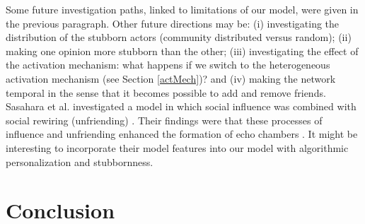 \documentclass[11 pt , letterpaper , twoside , openright]{book}
\begin{document}
Some future investigation paths, linked to limitations of our model, were given in the previous paragraph. Other future directions may be: (i) investigating the distribution of the stubborn actors (community distributed versus random); (ii) making one opinion more stubborn than the other; (iii) investigating the effect of the activation mechanism: what happens if we switch to the heterogeneous activation mechanism (see Section \ref{actMech})? and (iv) making the network temporal in the sense that it becomes possible to add and remove friends. Sasahara et al. investigated a model in which social influence was combined with social rewiring (unfriending) \cite{Sasahara2020}. Their findings were that these processes of influence and unfriending enhanced the formation of echo chambers \cite{Sasahara2020}. It might be interesting to incorporate their model features into our model with algorithmic personalization and stubbornness. 

\chapter{Conclusion}
\end{document}
